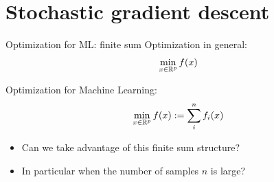 
\section{Stochastic gradient descent}


\begin{frame}{Optimization for ML: finite sum}
    Optimization in general:
    \begin{align*}
        \min_{x \in \mathbb{R}^p} f(x)
    \end{align*}

    \pause

    Optimization for Machine Learning:
    \begin{align*}
        \min_{x \in \mathbb{R}^p} f(x) := \sum_i^n f_i(x)
    \end{align*}

    \pause

    \begin{itemize}
        \item Can we take advantage of this \alert{finite sum} structure?
        \item In particular when the number of samples $n$ is large?
    \end{itemize}

\end{frame}


